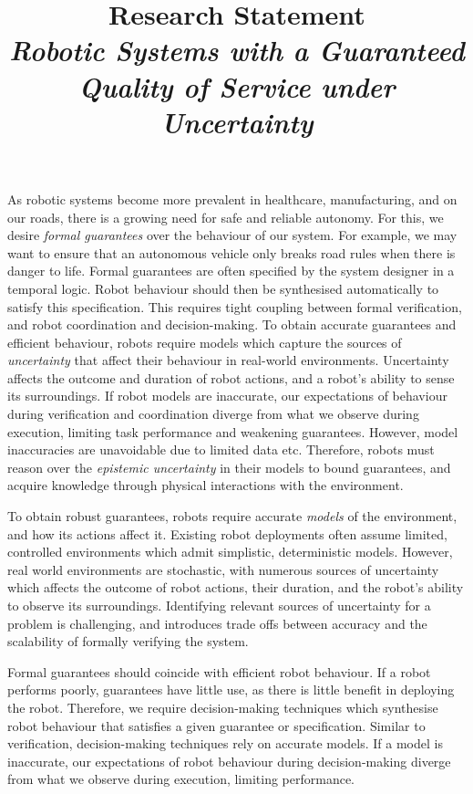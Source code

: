 \documentclass[12pt]{article}
\title{Research Statement\\ \large \emph{Robotic Systems with a Guaranteed Quality of Service under Uncertainty}}
\date{}
\author{}
\begin{document}
\maketitle
\thispagestyle{empty}


As robotic systems become more prevalent in healthcare, manufacturing, and on our roads, there is a growing need for safe and reliable autonomy.
%
For this, we desire \emph{formal guarantees} over the behaviour of our system.
%
For example, we may want to ensure that an autonomous vehicle only breaks road rules when there is danger to life.
%
Formal guarantees are often specified by the system designer in a temporal logic.
%
Robot behaviour should then be synthesised automatically to satisfy this specification.
%
This requires tight coupling between formal verification, and robot coordination and decision-making.
%
To obtain accurate guarantees and efficient behaviour, robots require models which capture the sources of \emph{uncertainty} that affect their behaviour in real-world environments.
%
Uncertainty affects the outcome and duration of robot actions, and a robot's ability to sense its surroundings.
%
If robot models are inaccurate, our expectations of behaviour during verification and coordination diverge from what we observe during execution, limiting task performance and weakening guarantees.
%
However, model inaccuracies are unavoidable due to limited data etc.
%
Therefore, robots must reason over the \emph{epistemic uncertainty} in their models to bound guarantees, and acquire knowledge through physical interactions with the environment.


\iffalse
%
To obtain robust guarantees, robots require accurate \emph{models} of the environment, and how its actions affect it.
%
Existing robot deployments often assume limited, controlled environments which admit simplistic, deterministic models.
%
However, real world environments are stochastic, with numerous sources of uncertainty which affects the outcome of robot actions, their duration, and the robot's ability to observe its surroundings.
%
Identifying relevant sources of uncertainty for a problem is challenging, and introduces trade offs between accuracy and the scalability of formally verifying the system.



Formal guarantees should coincide with efficient robot behaviour.
%
If a robot performs poorly, guarantees have little use, as there is little benefit in deploying the robot.
%
Therefore, we require decision-making techniques which synthesise robot behaviour that satisfies a given guarantee or specification.
%
Similar to verification, decision-making techniques rely on accurate models.
%
If a model is inaccurate, our expectations of robot behaviour during decision-making diverge from what we observe during execution, limiting performance.
\end{document}
